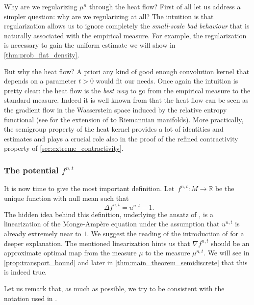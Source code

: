 \documentclass[JEP,XML,SOM,Unicode]{cedram}
\theoremstyle{plain}
\theoremstyle{definition}
\numberwithin{equation}{section}
\newcommand{\RR}{\ensuremath{\mathbb R}}
\newcommand{\lapl}{\ensuremath{\Delta}}
\newcommand{\fullstop}{\ensuremath{\text{. }}}
\begin{document}
Why are we regularizing $\mu^n$ through the heat flow?
First of all let us address a simpler question: why are we
regularizing at all? The intuition is that regularization allows us to ignore completely the
\emph{small-scale bad behaviour} that is naturally associated with the empirical measure.
For example, the regularization is necessary to gain the uniform estimate we will show
in \cref{thm:prob_flat_density}.

But why the heat flow? A priori any kind of good enough convolution kernel that depends on a parameter
$t>0$ would fit our needs. Once again the intuition is pretty clear: the heat flow is the \emph{best way} to
go from the empirical measure to the standard measure. Indeed it is well known from \cite{Jordan-Kinderlehrer-Otto98} that the heat flow can be
seen as the gradient flow in the Wasserstein space induced by the relative entropy functional (see \cite{Erbar2010}
for the extension of \cite{Jordan-Kinderlehrer-Otto98} to Riemannian manifolds). More practically, the semigroup property
of the heat kernel provides a lot of identities
and estimates and plays a crucial role also in the proof of the
refined contractivity property of \cref{sec:extreme_contractivity}.

\subsubsection{The potential $f^{n,t}$}
It is now time to give the most important definition. Let~$f^{n,t}:M\to\RR$ be the unique function with null
mean such that
\begin{equation}\label{eq:definition_f}
-\lapl f^{n,t} = u^{n,t} - 1 \fullstop
\end{equation}
The hidden idea behind this definition, underlying the ansatz of \cite{CaraccioloEtAl2014},
is a linearization of the Monge-Ampère equation under the assumption
that $u^{n,t}$ is already extremely near to $1$. We suggest the reading of the introduction of
\cite{Ambrosio-Stra-Trevisan2018} for a deeper explanation.
The mentioned linearization hints us that $\nabla f^{n,t}$ should be an approximate optimal map from
the measure $\mu$ to the measure $\mu^{n,t}$. We will see in \cref{prop:transport_bound} and later
in \cref{thm:main_theorem_semidiscrete} that this is indeed true.

Let us remark that, as much as possible, we try to be consistent with the notation used in
\cite{Ambrosio-Stra-Trevisan2018}.
\end{document}
